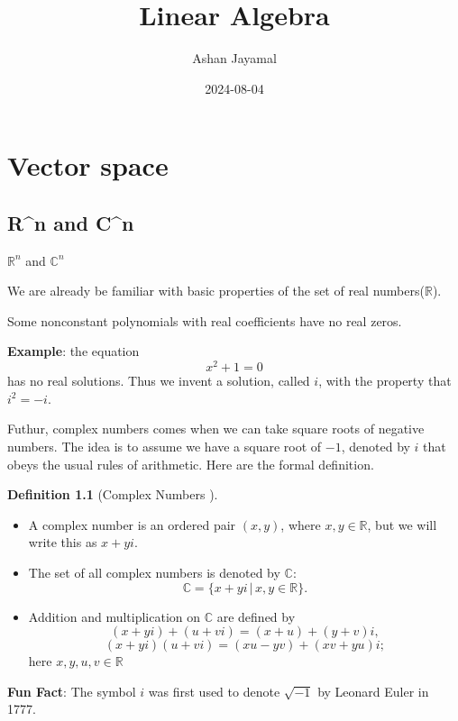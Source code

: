 \documentclass[
]{book}
\title{Linear Algebra}
\author{Ashan Jayamal}
\date{2024-08-04}
\providecommand{\tightlist}{%
  \setlength{\itemsep}{0pt}\setlength{\parskip}{0pt}}
\theoremstyle{definition}
\newtheorem{definition}{Definition}[chapter]
\theoremstyle{definition}
\theoremstyle{definition}
\theoremstyle{definition}
\theoremstyle{remark}
\begin{document}
\maketitle

{
\setcounter{tocdepth}{1}
\tableofcontents
}
\chapter{Vector space}\label{vector-space}

\section{R\^{}n and C\^{}n}\label{rn-and-cn}

\(\mathbb{R}^n\) and \(\mathbb{C}^n\)

We are already be familiar with basic properties of the set of real numbers(\(\mathbb{R}\)).

Some nonconstant polynomials with real coefficients have no real
zeros.

\textbf{Example}: the equation
\[x^2+1=0\]
has no real solutions.
Thus we invent a solution, called \(i\), with the property that \(i^2 = -i\).

Futhur, complex numbers comes when we can take square roots of negative numbers. The idea is to assume we have a square root of \(−1\), denoted by \(i\) that obeys the usual rules of arithmetic. Here are the formal definition.

\begin{definition}[Complex Numbers ]
\protect\hypertarget{def:unnamed-chunk-1}{}\label{def:unnamed-chunk-1}\leavevmode

\begin{itemize}
\tightlist
\item
  A complex number is an ordered pair \((x, y)\), where \(x, y \in \mathbb{R}\), but we will write this as \(x + yi\).
\item
  The set of all complex numbers is denoted by \(\mathbb{C}\):
  \[\mathbb{C} = \{x + yi \,|\, x, y \in \mathbb{R}\}.\]
\item
  Addition and multiplication on \(\mathbb{C}\) are defined by
  \[(x + yi) + (u + vi) = (x + u) + (y + v)i,\]
  \[(x + yi)(u + vi) = (xu - yv) + (xv + yu)i;\]
  here \(x, y, u, v \in \mathbb{R}\)
\end{itemize}

\end{definition}

\textbf{Fun Fact}: The symbol \(i\) was first used to denote \(\sqrt{-1}\) by Leonard Euler in 1777.
\end{document}
